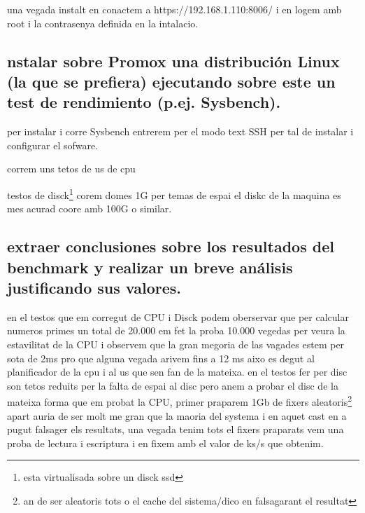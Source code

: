 \documentclass[preprint,11pt]{elsarticle}
\begin{document}
una vegada instalt en conactem a https://192.168.1.110:8006/ i en logem amb root i la contrasenya definida en la intalacio. 

\clearpage

\subsection{nstalar sobre Promox una distribución Linux (la que se prefiera) ejecutando sobre este un test de rendimiento (p.ej. Sysbench).}

per instalar i corre Sysbench entrerem per el modo text SSH per tal de instalar i configurar el sofware.
\smallskip

correm uns tetos de us de cpu 
\smallskip

\clearpage

testos de disck\footnote{esta virtualisada sobre un disck ssd} corem domes 1G per temas de espai el diskc de la maquina es mes acurad coore amb 100G o similar.

\smallskip

\subsection{extraer conclusiones sobre los resultados del benchmark y realizar un breve análisis justificando sus valores.}
en el testos que em corregut de CPU i Disck podem oberservar que per calcular numeros primes un total de 20.000 em fet la proba 10.000 vegedas per veura la estavilitat de la CPU i observem que la gran megoria de las vagades estem per sota de 2ms pro que alguna vegada arivem fins a 12 ms aixo es degut al planificador de la cpu i al us que sen fan de la mateixa.\newline
en el testos fer per disc son tetos reduits per la falta de espai al disc pero anem a probar el disc de la mateixa forma que em probat la CPU, primer praparem 1Gb de fixers aleatoris\footnote{an de ser aleatoris tots o el cache del sistema/dico en falsagarant el resultat} apart auria de ser molt me gran que la maoria del systema i en aquet cast en a pugut falsager els resultats, una vegada tenim tots el fixers praparats vem una proba de lectura i escriptura i en fixem amb el valor de ks/s que obtenim.\smallskip
\end{document}
